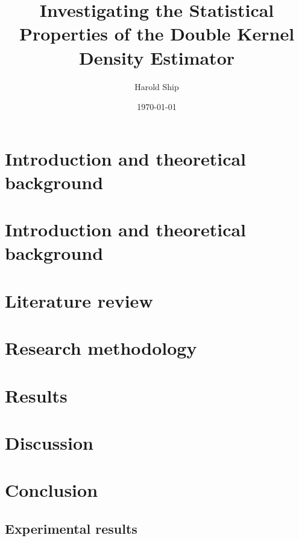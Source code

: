 \documentclass[a4paper,12pt,titlepage,twoside,openany]{book}
\title{Investigating the Statistical Properties of the Double Kernel Density Estimator}
\author{Harold Ship}
\date{\today}
\begin{document}
\frontmatter                            %
\maketitle                              %
\tableofcontents                        %

\clearpage
\listoftables
\clearpage
\listoffigures
\clearpage
\printnomenclature
\clearpage

\mainmatter                             %

\chapter{Introduction and theoretical background}
\label{ch:introduction}


\chapter{Introduction and theoretical background}
\label{ch:theory}


\chapter{Literature review}
\label{ch:literature}


\chapter{Research methodology}
\label{ch:method}


\chapter{Results}
\label{ch:results}


\chapter{Discussion}
\label{ch:discussion}


\chapter{Conclusion}
\label{ch:conclusion}


 

\begin{appendices}
\chapter{Experimental results}
\label{ch:results_tables}

\end{appendices}
\end{document}
